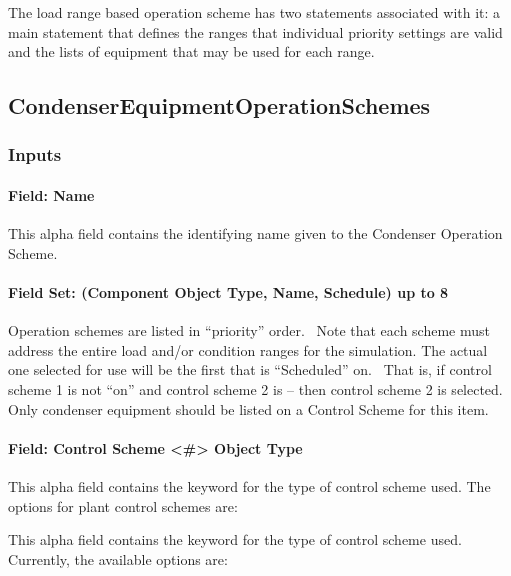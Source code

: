 The load range based operation scheme has two statements associated with it: a main statement that defines the ranges that individual priority settings are valid and the lists of equipment that may be used for each range.

\subsection{CondenserEquipmentOperationSchemes}\label{condenserequipmentoperationschemes}

\subsubsection{Inputs}\label{inputs-1-030}

\paragraph{Field: Name}\label{field-name-1-029}

This alpha field contains the identifying name given to the Condenser Operation Scheme.

\paragraph{Field Set: (Component Object Type, Name, Schedule) up to 8}\label{field-set-component-object-type-name-schedule-up-to-8-1}

Operation schemes are listed in ``priority'' order.~ Note that each scheme must address the entire load and/or condition ranges for the simulation. The actual one selected for use will be the first that is ``Scheduled'' on.~ That is, if control scheme 1 is not ``on'' and control scheme 2 is -- then control scheme 2 is selected. Only condenser equipment should be listed on a Control Scheme for this item.

\paragraph{Field: Control Scheme \textless{}\#\textgreater{} Object Type}\label{field-control-scheme-object-type-1}

This alpha field contains the keyword for the type of control scheme used. The options for plant control schemes are:

This alpha field contains the keyword for the type of control scheme used. Currently, the available options are:

